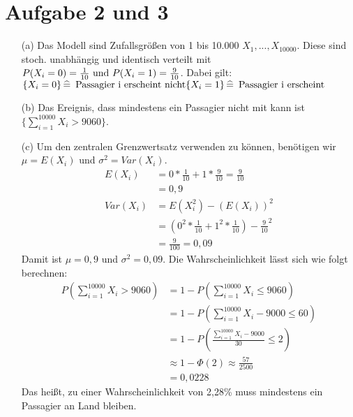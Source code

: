 \documentclass[10pt,a4paper]{article}
\newcommand{\ent}{\mathop{\widehat{=}}}
\begin{document}
\section*{Aufgabe 2 und 3}
\begin{itemize}
\item[(a)] Das Modell sind Zufallsgrößen von 1 bis 10.000 $X_1,...,X_{10000}$. Diese sind stoch. unabhängig und identisch verteilt mit $P(X_i = 0) = \frac{1}{10} \text{ und }\\
P(X_i=1) = \frac{9}{10}$. Dabei gilt:\\
$\{X_i = 0\} \ent \text{ Passagier i erscheint nicht}\\
\{X_i=1\} \ent \text{ Passagier i erscheint}$
\item[(b)] Das Ereignis, dass mindestens ein Passagier nicht mit kann ist $\{ \sum\nolimits_{i=1}^{10000} X_i > 9060\}$.
\item[(c)] Um den zentralen Grenzwertsatz verwenden zu können, benötigen wir $\mu = E(X_i)$ und $\sigma^2 = Var(X_i)$.\\
\begin{align*}
E(X_i) &= 0*\frac{1}{10} + 1* \frac{9}{10} = \frac{9}{10}\\
&= 0,9 \\
Var(X_i) &= E(X_i^2)-(E(X_i))^2\\
&= (0^2*\frac{1}{10}+1^2*\frac{1}{10})-\frac{9}{10}^2\\
&= \frac{9}{100} = 0,09
\end{align*}
Damit ist $\mu = 0,9$ und $\sigma^2 = 0,09$. Die Wahrscheinlichkeit lässt sich wie folgt berechnen:\\
\begin{align*}
P(\sum\nolimits_{i=1}^{10000} X_i > 9060) &= 1 - P(\sum\nolimits_{i=1}^{10000} X_i \leq 9060)\\
&= 1-P(\sum\nolimits_{i=1}^{10000} X_i-9000 \leq 60)\\
&= 1-P(\frac{\sum\nolimits_{i=1}^{10000} X_i-9000}{30} \leq 2)\\
&\approx 1-\Phi(2) \approx \frac{57}{2500}\\
&= 0,0228
\end{align*}
Das heißt, zu einer Wahrscheinlichkeit von 2,28\% muss mindestens ein Passagier an Land bleiben.
\end{itemize}
\end{document}
